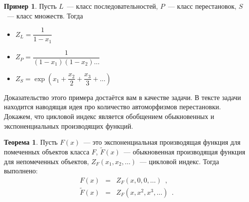 \documentclass{article}
\theoremstyle{definition}
\newtheorem{example}{Пример}
\newtheorem*{theorem}{Теорема}
\begin{document}
\begin{example}
	Пусть \( L \)~--- класс последовательностей, \( P \)~--- класс 
	перестановок, \( S \)~--- класс множеств. Тогда
	\begin{itemize}
		\item	\( Z_L = \dfrac{1}{1 - x_1} \)
		\item 	\( Z_P = \dfrac{1}{(1-x_1)(1-x_2)\ldots} \)
		\item   \( Z_S = \exp \left(
			x_1 + \dfrac{x_2}{2} + \dfrac{x_3}{3} + \ldots
		\right) \)
	\end{itemize}
\end{example}

Доказательство этого примера достаётся вам в качестве задачи. В тексте задачи
находится наводящая идея про количество автоморфизмов перестановки.
Докажем, что цикловой индекс является обобщением обыкновенных и 
экспоненциальных производящих функций.

\begin{theorem}
Пусть \( F(x) \)~--- это экспоненциальная производящая функция для помеченных
объектов класса \( F \), \( \widetilde F(x) \)~--- обыкновенная производящая
функция для непомеченных объектов, \( Z_F(x_1, x_2, \ldots) \)~--- цикловой
индекс. Тогда выполнено:
\begin{eqnarray}
    F(x) &=&  Z_F(x, 0, 0, \ldots) \enspace , \\ 
    \widetilde F(x) &=& Z_F(x, x^2, x^3, \ldots) \enspace . 
\end{eqnarray}
\end{theorem}
\end{document}
